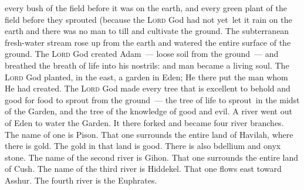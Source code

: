 \begin{inparaenum}
     every bush of the field before it was on the earth, and every green plant of the field before they sprouted (because the \textsc{Lord} God had not yet\understood\ let it rain on the earth and there was no man to till and cultivate the ground.%
     The subterranean fresh-water stream rose up from the earth and watered the entire surface of the ground.%
     The \textsc{Lord} God created Adam~--- loose soil from the ground~--- and breathed the breath of life into his nostrils: and man became a living soul.%
     The \textsc{Lord} God planted, in the east, a garden in Eden; He there put the man whom He had created.%
     The \textsc{Lord} God made every tree that is excellent to behold and good for food to sprout from the ground~--- the tree of life to sprout\understood\ in the midst of the Garden, and the tree of the knowledge of good and evil.%
     A river went out of Eden to water the Garden. It there forked and became four river branches.%
     The name of one is Pison. That one surrounds the entire land of Havilah, where there is gold.%
     The gold in that land is good. There is also bdellium and onyx stone.%
     The name of the second river is Gihon. That one surrounds the entire land of Cush.%
     The name of the third river is Hiddekel. That one flows east toward Asshur. The fourth river is the Euphrates.%

\end{inparaenum}

